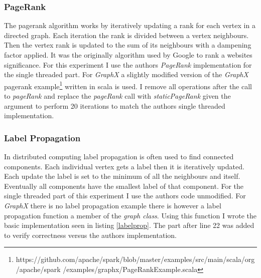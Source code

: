 \subsubsection{PageRank}
The pagerank algorithm works by iteratively updating a rank for each vertex in a directed graph. Each iteration the rank is divided between a vertex neighbours. Then the vertex rank is updated to the sum of its neighbours with a dampening factor applied. It was the originally algorithm used by Google to rank a websites significance. For this experiment I use the authors \textit{PageRank} implementation for the single threaded part. For \textit{GraphX} a slightly modified version of the \textit{GraphX} pagerank example\footnote{https://github.com/apache/spark/blob/master/examples/src/main/scala/org/apache/spark /examples/graphx/PageRankExample.scala} written in scala is used. I remove all operations after the call to \textit{pageRank} and replace the \textit{pageRank} call with \textit{staticPageRank} given the argument to perform 20 iterations to match the authors single threaded implementation.

\subsubsection{Label Propagation}
In distributed computing label propagation is often used to find connected components. Each individual vertex gets a label then it is iteratively updated. Each update the label is set to the minimum of all the neighbours and itself. Eventually all components have the smallest label of that component. For the single threaded part of this experiment I use the authors code unmodified. For \textit{GraphX} there is no label propagation example there is however a label propagation function a member of the \textit{graph class}. Using this function I wrote the basic implementation seen in listing \ref{labelprop}. The part after line 22 was added to verify correctness versus the authors implementation.

